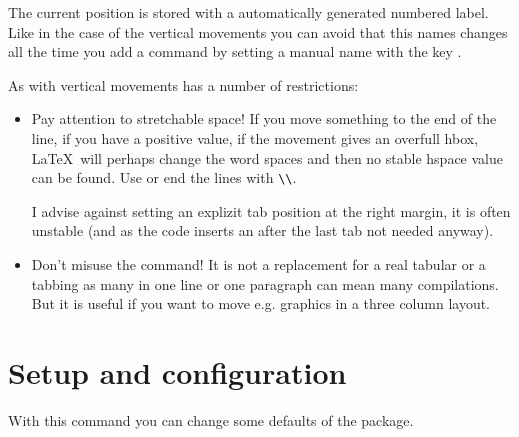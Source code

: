\documentclass[twoside,parskip=half-,fontsize=12pt,egregdoesnotlikesansseriftitles,headings=normal]{scrartcl}
\begin{document}
The current position is stored with a automatically generated numbered label. Like in the case of the vertical movements you can avoid that this names changes all the time you add a command by setting a manual name with the key .

As with vertical movements  has a number of restrictions:

\begin{itemize}
\item Pay attention to stretchable space! If you move something to the end of the line, if you have a positive  value, if the movement gives an overfull hbox, \LaTeX\ will perhaps change the word spaces and then no stable hspace value can be found.  Use  or end the lines with \verb+\\+.

    I advise against setting an explizit tab position at the right margin, it is often unstable (and as the code inserts an  after the last tab not needed anyway).


\item Don't misuse the command! It is not a replacement for a real tabular or a tabbing as many  in one line or one paragraph can mean many compilations. But it is useful if you want to move e.g. graphics in a three column layout.
\end{itemize}



\section{Setup and configuration}\label{sec:setup}

\DescribeMacro{}

With this command you can change some defaults of the package.
\end{document}
